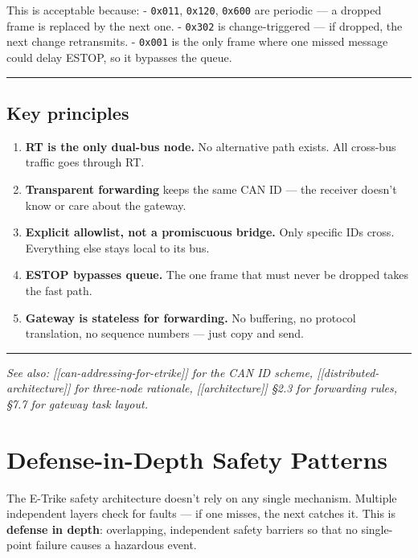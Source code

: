 \documentclass[12pt,a4paper,oneside]{report}
\providecommand{\tightlist}{\setlength{\itemsep}{0pt}\setlength{\parskip}{0pt}}
\begin{document}
This is acceptable because: - \texttt{0x011}, \texttt{0x120}, \texttt{0x600} are
periodic --- a dropped frame is replaced by the next one. - \texttt{0x302} is
change-triggered --- if dropped, the next change retransmits. - \texttt{0x001}
is the only frame where one missed message could delay ESTOP, so it bypasses the
queue.

\begin{center}\rule{0.5\linewidth}{0.5pt}\end{center}

\section{Key principles}\label{key-principles}

\begin{enumerate}
\def\labelenumi{\arabic{enumi}.}
\tightlist
\item
  \textbf{RT is the only dual-bus node.} No alternative path exists. All
  cross-bus traffic goes through RT.
\item
  \textbf{Transparent forwarding} keeps the same CAN ID --- the receiver doesn't
  know or care about the gateway.
\item
  \textbf{Explicit allowlist, not a promiscuous bridge.} Only specific IDs
  cross. Everything else stays local to its bus.
\item
  \textbf{ESTOP bypasses queue.} The one frame that must never be dropped takes
  the fast path.
\item
  \textbf{Gateway is stateless for forwarding.} No buffering, no protocol
  translation, no sequence numbers --- just copy and send.
\end{enumerate}

\begin{center}\rule{0.5\linewidth}{0.5pt}\end{center}

\emph{See also: {[}{[}can-addressing-for-etrike{]}{]} for the CAN ID scheme,
{[}{[}distributed-architecture{]}{]} for three-node rationale,
{[}{[}architecture{]}{]} §2.3 for forwarding rules, §7.7 for gateway task
layout.}


\chapter{Defense-in-Depth Safety
Patterns}\label{defense-in-depth-safety-patterns}

The E-Trike safety architecture doesn't rely on any single mechanism. Multiple
independent layers check for faults --- if one misses, the next catches it. This
is \textbf{defense in depth}: overlapping, independent safety barriers so that
no single-point failure causes a hazardous event.
\end{document}
